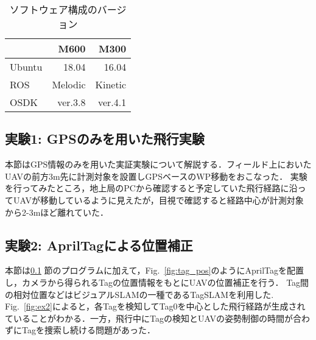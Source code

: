 \documentclass[a4j,fleqn,dvipdfmx,uplatex]{jsarticle}
\newcommand{\figref}[1]{Fig.\ \ref{#1}}
\newcommand{\subsecref}[1]{\ref{#1}\hspace{0.2zw} 節}
\begin{document}
\begin{table}[h]
    \caption{ソフトウェア構成のバージョン}
    \label{table:software}
    \centering
    \begin{tabular}{lrr}
        & M600 & M300 \\
        \hline \hline
        Ubuntu & 18.04 & 16.04 \\
        ROS & Melodic & Kinetic \\
        OSDK & ver.3.8 & ver.4.1 \\
        \hline
    \end{tabular}
\end{table}



\subsection{実験1: GPSのみを用いた飛行実験}\label{subsec:ex1}
本節はGPS情報のみを用いた実証実験について解説する．フィールド上においたUAVの前方3m先に計測対象を設置しGPSベースのWP移動をおこなった．
実験を行ってみたところ，地上局のPCから確認すると予定していた飛行経路に沿ってUAVが移動しているように見えたが，目視で確認すると経路中心が計測対象から2-3mほど離れていた．

\subsection{実験2: AprilTagによる位置補正}\label{subsec:ex2}
本節は\subsecref{subsec:ex1}のプログラムに加えて，\figref{fig:tag_pos}のようにAprilTagを配置し，カメラから得られるTagの位置情報をもとにUAVの位置補正を行う．
Tag間の相対位置などはビジュアルSLAM\cite{SLAM}の一種であるTagSLAMを利用した\cite{TagSLAMurl}\cite{TagSLAM}.
\figref{fig:ex2}によると，各Tagを検知してTag0を中心とした飛行経路が生成されていることがわかる．一方，飛行中にTagの検知とUAVの姿勢制御の時間が合わずにTagを捜索し続ける問題があった．
\end{document}

